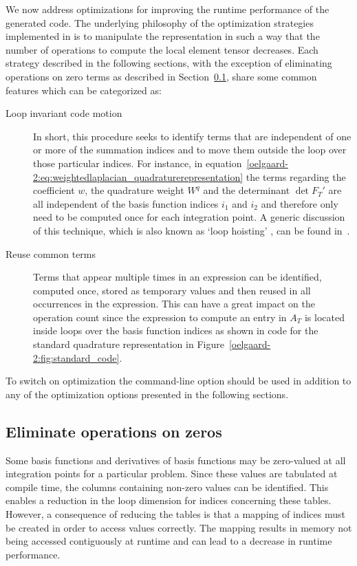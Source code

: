 We now address optimizations for improving the runtime performance
of the generated code.  The underlying philosophy of the optimization
strategies implemented in \ffc{} is to manipulate the representation in
such a way that the number of operations to compute the local element
tensor decreases.  Each strategy described in the following sections,
with the exception of eliminating operations on zero terms as described in
Section~\ref{oelgaard-2:sec:eliminate_zeros}, share some common features
which can be categorized as:
%
\begin{description}
  \item[Loop invariant code motion] In short, this procedure
  seeks to identify terms that are independent of one or
  more of the summation indices and to move them outside
  the loop over those particular indices.  For instance, in
  equation~\eqref{oelgaard-2:eq:weightedlaplacian_quadraturerepresentation}
  the terms regarding the coefficient $w$, the quadrature weight $W^q$ and
  the determinant $\det F_T'$ are all independent of the basis function
  indices $i_1$ and $i_2$ and therefore only need to be computed once
  for each integration point.  A generic discussion of this technique,
  which is also known as `loop hoisting' , can be
  found in~\citet{AhoSethiUllman1986}.

  \item[Reuse common terms] Terms that appear multiple times in an
  expression can be identified, computed once, stored as temporary values
  and then reused in all occurrences in the expression.  This can have
  a great impact on the operation count since the expression to compute
  an entry in $A_T$ is located inside loops over the basis function
  indices as shown in code for the standard quadrature representation
  in Figure~\ref{oelgaard-2:fig:standard_code}.
\end{description}
%
To switch on optimization the command-line option  should be
used in addition to any of the \ffc{} optimization options presented in
the following sections.
\subsection{Eliminate operations on zeros}
\label{oelgaard-2:sec:eliminate_zeros}
%
Some basis functions and derivatives of basis functions may be zero-valued
at all integration points for a particular problem.  Since these values
are tabulated at compile time, the columns containing non-zero values
can be identified.  This enables a reduction in the loop dimension for
indices concerning these tables.  However, a consequence of reducing the
tables is that a mapping of indices must be created in order to access
values correctly.  The mapping results in memory not being accessed
contiguously at runtime and can lead to a decrease in runtime performance.

